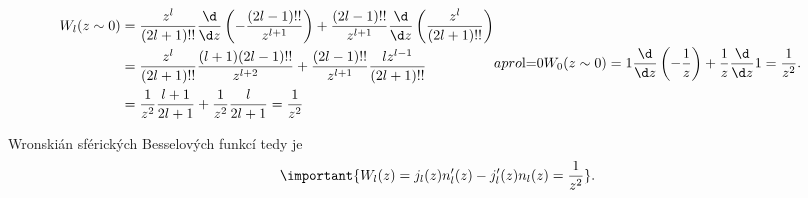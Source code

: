 \begin{solution}
    \begin{subequations}
        \begin{align}
            W_{l}(z\sim0)
                &=\frac{z^{l}}{(2l+1)!!}\frac{\d}{\d z}\left(-\frac{(2l-1)!!}{z^{l+1}}\right)
                    +\frac{(2l-1)!!}{z^{l+1}}\frac{\d}{\d z}\left(\frac{z^{l}}{(2l+1)!!}\right)\nonumber\\
                &=\frac{z^{l}}{(2l+1)!!}\frac{(l+1)(2l-1)!!}{z^{l+2}}
                    +\frac{(2l-1)!!}{z^{l+1}}\frac{lz^{l-1}}{(2l+1)!!}\nonumber\\
                &=\frac{1}{z^{2}}\frac{l+1}{2l+1}+\frac{1}{z^{2}}\frac{l}{2l+1}
                    =\frac{1}{z^{2}}
        \end{align}
        a pro $l=0$
        \begin{align}
            W_{0}(z\sim0)
                &=1\frac{\d}{\d z}\left(-\frac{1}{z}\right)
                    +\frac{1}{z}\frac{\d}{\d z}1
                    =\frac{1}{z^{2}}.
        \end{align}            
    \end{subequations}
    
    Wronskián sférických Besselových funkcí tedy je
    \begin{equation}\label{eq:SphericalBesselWronskian}
        \important{
            W_{l}(z)
                =j_{l}(z)n'_{l}(z)-j'_{l}(z)n_{l}(z)
                =\frac{1}{z^{2}}
        }.
    \end{equation}
\end{solution}
